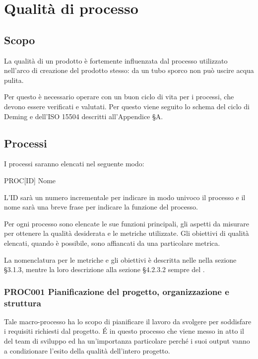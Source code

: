 \section{Qualità di processo}\label{QualitaProcesso}

\subsection{Scopo}
La qualità di un prodotto è fortemente influenzata dal processo utilizzato nell'arco di creazione del prodotto stesso: da un tubo sporco non può uscire acqua pulita.

Per questo è necessario operare con un buon ciclo di vita per i processi, che devono essere verificati e valutati. Per questo viene seguito lo schema del ciclo di Deming e dell'ISO 15504 descritti all'Appendice §A.

\subsection{Processi}
I processi saranno elencati nel seguente modo:

\begin{center}
	PROC[ID] Nome
\end{center}

L'ID sarà un numero incrementale per indicare in modo univoco il processo e il nome sarà una breve frase per indicare la funzione del processo.

Per ogni processo sono elencate le sue funzioni principali, gli aspetti da misurare per ottenere la qualità desiderata e le metriche utilizzate. Gli obiettivi di qualità elencati, quando è possibile, sono affiancati da una particolare metrica. 

La nomenclatura per le metriche e gli obiettivi è descritta nelle \Doc{\NdP} nella sezione §3.1.3, mentre la loro descrizione alla sezione §4.2.3.2 sempre del \Doc{\NdP}.

	\subsubsection{PROC001 Pianificazione del progetto, organizzazione e struttura}
	Tale macro-processo ha lo scopo di pianificare il lavoro da svolgere per soddisfare i requisiti richiesti dal progetto. \'E in questo processo che viene messo in atto il  del team di sviluppo ed ha un'importanza particolare perché i suoi output vanno a condizionare l'esito della qualità dell'intero progetto.
	
